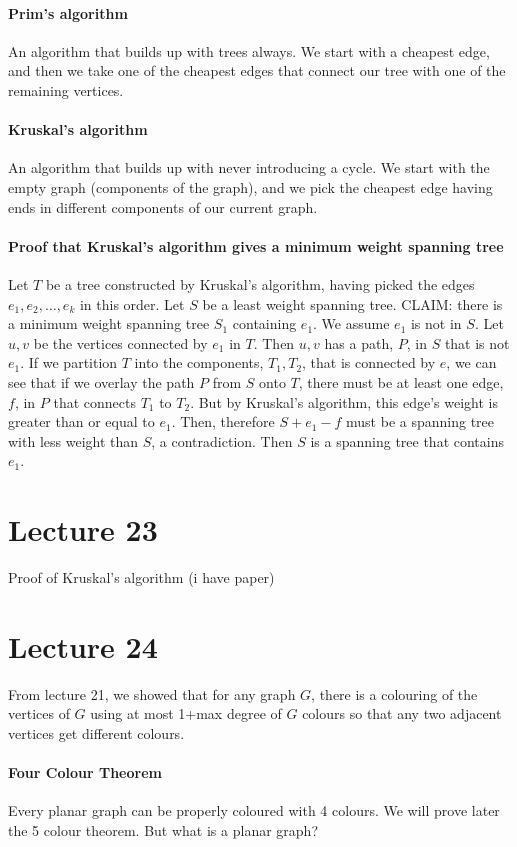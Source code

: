 \documentclass[10pt,letter]{article}
\begin{document}
\paragraph{Prim's algorithm}
An algorithm that builds up with trees always. We start with a cheapest edge, and then we take one of the cheapest edges that connect our tree with one of the remaining vertices. 
\paragraph{Kruskal's algorithm}
An algorithm that builds up with never introducing a cycle. We start with the empty graph (components of the graph), and we pick the cheapest edge having ends in different components of our current graph. 

\paragraph{Proof that Kruskal's algorithm gives a minimum weight spanning tree}
Let $T$ be a tree constructed by Kruskal's algorithm, having picked the edges $e_1,e_2,\ldots,e_k$ in this order. Let $S$ be a least weight spanning tree. CLAIM: there is a minimum weight spanning tree $S_1$ containing $e_1$. We assume $e_1$ is not in $S$. Let $u,v$ be the vertices connected by $e_1$ in $T$. Then $u,v$ has a path, $P$, in $S$ that is not $e_1$. If we partition $T$ into the components, $T_1,T_2$, that is connected by $e$, we can see that if we overlay the path $P$ from $S$ onto $T$, there must be at least one edge, $f$, in $P$ that connects $T_1$ to $T_2$. But by Kruskal's algorithm, this edge's weight is greater than or equal to $e_1$. Then, therefore $S+e_1-f$ must be a spanning tree with less weight than $S$, a contradiction. Then $S$ is a spanning tree that contains $e_1$. 

\section*{Lecture 23}
Proof of Kruskal's algorithm (i have paper)

\section*{Lecture 24}
From lecture 21, we showed that for any graph $G$, there is a colouring of the vertices of $G$ using at most 1+max degree of $G$ colours so that any two adjacent vertices get different colours. 
\paragraph{Four Colour Theorem}
Every planar graph can be properly coloured with 4 colours. We will prove later the 5 colour theorem. But what is a planar graph?
\end{document}
